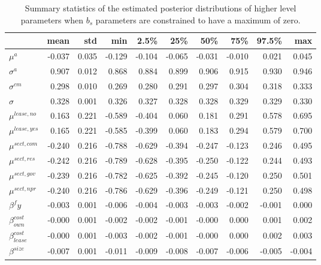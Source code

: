 \documentclass[a4paper]{article}
\begin{document}
\begin{table}
\begin{tabular}{lrrrrrrrrr}
\toprule
{} &    mean &    std &     min &    2.5\% &     25\% &     50\% &     75\% &   97.5\% &           max \\
\midrule
$\mu^a$      & -0.037 & 0.035 & -0.129 & -0.104 & -0.065 & -0.031 & -0.010 &  0.021 &  0.045 \\
$\sigma^a$   &  0.907 & 0.012 &  0.868 &  0.884 &  0.899 &  0.906 &  0.915 &  0.930 &  0.946 \\
$\sigma^{cm} $    &  0.298 & 0.010 &  0.269 &  0.280 &  0.291 &  0.297 &  0.304 &  0.318 &  0.333 \\
$\sigma$      &  0.328 & 0.001 &  0.326 &  0.327 &  0.328 &  0.328 &  0.329 &  0.329 &  0.330 \\
$\mu^{lease, no} $  &  0.163 & 0.221 & -0.589 & -0.404 &  0.060 &  0.181 &  0.291 &  0.578 &  0.695 \\
$\mu^{lease, yes}$  &  0.165 & 0.221 & -0.585 & -0.399 &  0.060 &  0.183 &  0.294 &  0.579 &  0.700 \\
$\mu^{sect, com}$      & -0.240 & 0.216 & -0.788 & -0.629 & -0.394 & -0.247 & -0.123 &  0.246 &  0.495 \\
$\mu^{sect, res} $       & -0.242 & 0.216 & -0.789 & -0.628 & -0.395 & -0.250 & -0.122 &  0.244 &  0.493 \\
$\mu^{sect, gov} $       & -0.239 & 0.216 & -0.782 & -0.625 & -0.392 & -0.245 & -0.120 &  0.250 &  0.501 \\
$\mu^{sect, npr}$       & -0.240 & 0.216 & -0.786 & -0.629 & -0.396 & -0.249 & -0.121 &  0.250 &  0.498 \\
$\beta^fy$   & -0.003 & 0.001 & -0.006 & -0.004 & -0.003 & -0.003 & -0.002 & -0.001 &  0.000 \\
$\beta_{own}^{cost}$ & -0.000 & 0.001 & -0.002 & -0.002 & -0.001 & -0.000 &  0.000 &  0.001 &  0.002 \\
$\beta_{lease}^{cost}$ & -0.000 & 0.001 & -0.003 & -0.002 & -0.001 & -0.000 &  0.000 &  0.002 &  0.003 \\
$\beta^{size}$ & -0.007 & 0.001 & -0.011 & -0.009 & -0.008 & -0.007 & -0.006 & -0.005 & -0.004 \\
\bottomrule
\end{tabular}
\caption{\label{table:higher_level_params_const}Summary statistics of the estimated posterior distributions of higher level parameters when $b_s$ parameters are constrained to have a maximum of zero.}
\end{table}
\end{document}
